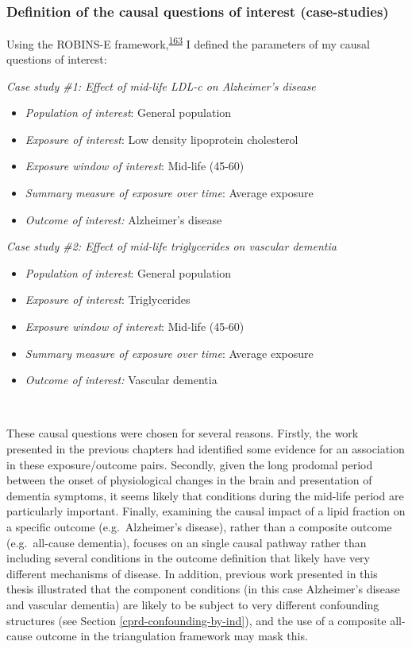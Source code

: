\documentclass[a4paper, twoside]{templates/ociamthesis}
\providecommand{\tightlist}{%
  \setlength{\itemsep}{0pt}\setlength{\parskip}{0pt}}
\begin{document}
~

\hypertarget{definition-of-the-causal-questions-of-interest-case-studies}{%
\subsubsection{Definition of the causal questions of interest (case-studies)}\label{definition-of-the-causal-questions-of-interest-case-studies}}

Using the ROBINS-E framework,\textsuperscript{\protect\hyperlink{ref-morganr2020}{163}} I defined the parameters of my causal questions of interest:

\emph{Case study \#1: Effect of mid-life LDL-c on Alzheimer's disease}

\begin{itemize}
\tightlist
\item
  \emph{Population of interest}: General population
\item
  \emph{Exposure of interest}: Low density lipoprotein cholesterol
\item
  \emph{Exposure window of interest}: Mid-life (45-60)
\item
  \emph{Summary measure of exposure over time}: Average exposure
\item
  \emph{Outcome of interest:} Alzheimer's disease
\end{itemize}

\emph{Case study \#2: Effect of mid-life triglycerides on vascular dementia}

\begin{itemize}
\tightlist
\item
  \emph{Population of interest}: General population
\item
  \emph{Exposure of interest}: Triglycerides
\item
  \emph{Exposure window of interest}: Mid-life (45-60)
\item
  \emph{Summary measure of exposure over time}: Average exposure
\item
  \emph{Outcome of interest:} Vascular dementia
\end{itemize}

~

These causal questions were chosen for several reasons. Firstly, the work presented in the previous chapters had identified some evidence for an association in these exposure/outcome pairs. Secondly, given the long prodomal period between the onset of physiological changes in the brain and presentation of dementia symptoms, it seems likely that conditions during the mid-life period are particularly important. Finally, examining the causal impact of a lipid fraction on a specific outcome (e.g.~Alzheimer's disease), rather than a composite outcome (e.g.~all-cause dementia), focuses on an single causal pathway rather than including several conditions in the outcome definition that likely have very different mechanisms of disease. In addition, previous work presented in this thesis illustrated that the component conditions (in this case Alzheimer's disease and vascular dementia) are likely to be subject to very different confounding structures (see Section \ref{cprd-confounding-by-ind}), and the use of a composite all-cause outcome in the triangulation framework may mask this.
\end{document}
